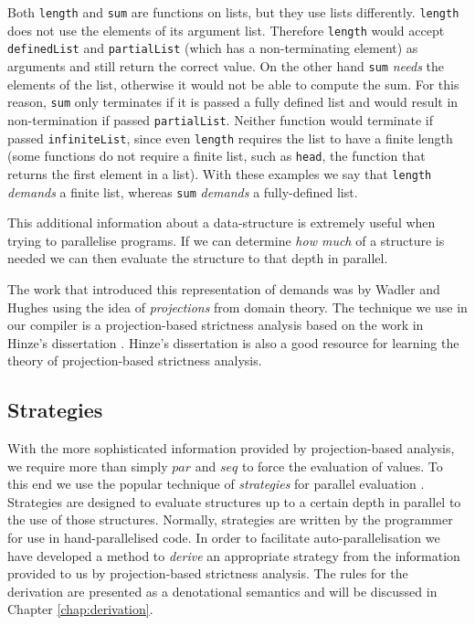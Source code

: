 Both \verb-length- and \verb-sum- are functions on lists, but they use lists
differently. \verb-length- does not use the elements of its argument list.
Therefore \verb-length- would accept \verb-definedList- and \verb-partialList-
(which has a non-terminating element) as arguments and still return the correct
value. On the other hand \verb-sum- \emph{needs} the elements of the list,
otherwise it would not be able to compute the sum. For this reason, \verb-sum-
only terminates if it is passed a fully defined list and would result in
non-termination if passed \verb-partialList-. Neither function would terminate
if passed \verb-infiniteList-, since even \verb-length- requires the list to
have a finite length (some functions do not require a finite list, such as
\verb-head-, the function that returns the first element in a list). With
these examples we say that \verb-length- \emph{demands} a finite list, whereas
\verb-sum- \emph{demands} a fully-defined list.

This additional information about a data-structure is extremely useful when
trying to parallelise programs. If we can determine \emph{how much} of a
structure is needed we can then evaluate the structure to that depth in
parallel.


The work that introduced this representation of demands was by Wadler and
Hughes \citep{wadler1987projections} using the idea of \emph{projections} from
domain theory.  The technique we use in our compiler is a projection-based
strictness analysis based on the work in Hinze's dissertation
\citep{hinze1995projection}.  Hinze's dissertation is also a good resource for
learning the theory of projection-based strictness analysis.


\subsection*{Strategies}

With the more sophisticated information provided by projection-based analysis,
we require more than simply $par$ and $seq$ to force the evaluation of
values. To this end we use the popular technique of \emph{strategies} for
parallel evaluation \citep{strategies, marlow2010seq}. Strategies are designed
to evaluate structures up to a certain depth in parallel to the use of those
structures. Normally, strategies are written by the programmer for use in
hand-parallelised code. In order to facilitate auto-parallelisation we have
developed a method to \emph{derive} an appropriate strategy from the
information provided to us by projection-based strictness analysis. The rules
for the derivation are presented as a denotational semantics and will be discussed
in Chapter \ref{chap:derivation}.
